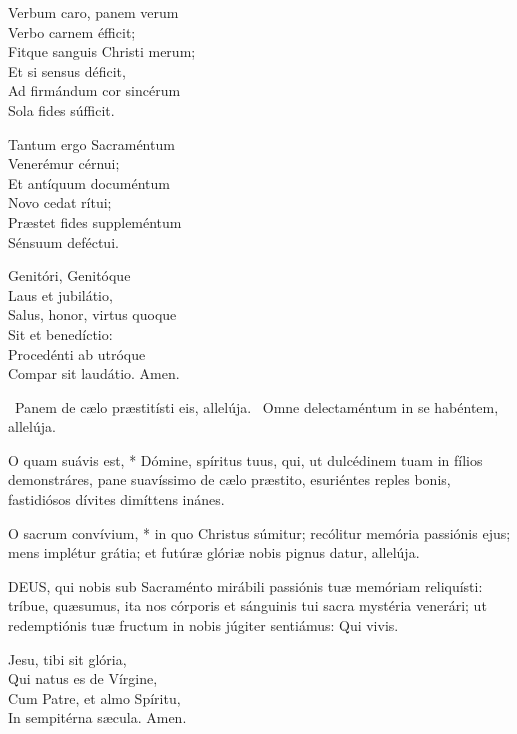 Verbum caro, panem verum\\
Verbo carnem éfficit;\\
Fitque sanguis Christi merum;\\
Et si sensus déficit,\\
Ad firmándum cor sincérum\\
Sola fides súfficit.


Tantum ergo Sacraméntum\\
Venerémur cérnui;\\
Et antíquum documéntum\\
Novo cedat rítui;\\
Præstet fides suppleméntum\\
Sénsuum deféctui.

Genitóri, Genitóque\\
Laus et jubilátio,\\
Salus, honor, virtus quoque\\
Sit et benedíctio:\\
Procedénti ab utróque\\
Compar sit laudátio. Amen.

\V\ Panem de cælo præstitísti eis, allelúja. \R\ Omne delectaméntum in se habéntem, allelúja.


 O quam suávis est, * Dómine, spíritus tuus, qui, ut dulcédinem tuam in fílios demonstráres, pane suavíssimo de cælo præstito, esuriéntes reples bonis, fastidiósos dívites dimíttens inánes.


 O sacrum convívium, * in quo Christus súmitur; recólitur memória passiónis ejus; mens implétur grátia; et futúræ glóriæ nobis pignus datur, allelúja.


\lettrine[lines=2]{D}{EUS}, qui nobis sub Sacraménto mirábili passiónis tuæ memóriam reliquísti: tríbue, quæsumus, ita nos córporis et sánguinis tui sacra mystéria venerári; ut redemptiónis tuæ fructum in nobis júgiter sentiámus: Qui vivis.



Jesu, tibi sit glória,\\
Qui natus es de Vírgine,\\
Cum Patre, et almo Spíritu,\\
In sempitérna sæcula. Amen.

